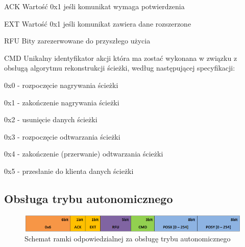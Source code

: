 \begin{basedescript}{\desclabelstyle{\pushlabel}\desclabelwidth{25mm}}
\setlength{\parsep}{0pt}
\setlength{\itemsep}{0mm}
\setlength{\parskip}{0pt}
\item[ACK]
	Wartość 0x1 jeśli komunikat wymaga potwierdzenia
\item[EXT] 
	Wartość 0x1 jeśli komunikat zawiera dane rozszerzone
\item[RFU] 
	Bity zarezerwowane do przyszłego użycia
\item[CMD] 
	Unikalny identyfikator akcji która ma zostać wykonana w związku z obsługą
	algorytmu rekonstrukcji ścieżki, według następującej specyfikacji:
	\begin{desc}
	\item[0x0] - rozpoczęcie nagrywania ścieżki
	\item[0x1] - zakończenie nagrywania ścieżki
	\item[0x2] - usunięcie danych ścieżki
	\item[0x3] - rozpoczęcie odtwarzania ścieżki
	\item[0x4] - zakończenie (przerwanie) odtwarzania ścieżki
	\item[0x5] - przesłanie do klienta danych ścieżki
	\end{desc}
\end{basedescript}

\subsection{Obsługa trybu autonomicznego}
\begin{figure}[h!]
 \centering
 \includegraphics[width=\textwidth]{../images/appendix/cmd_0x06.png}
 \caption{Schemat ramki odpowiedzialnej za obsługę trybu autonomicznego}
 \label{fig:CMD_0x06}
\end{figure}

